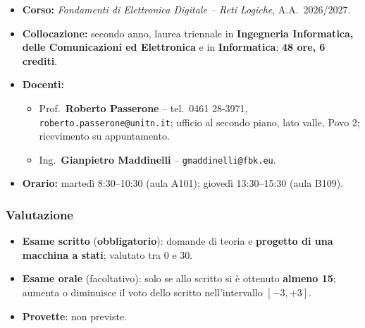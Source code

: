 \documentclass[12pt, a4paper]{article}
\begin{document}
\begin{itemize}
    \item \textbf{Corso:} \emph{Fondamenti di Elettronica Digitale -- Reti Logiche}, A.A.\ 2026/2027.
    \item \textbf{Collocazione:} secondo anno, laurea triennale in \textbf{Ingegneria Informatica, delle Comunicazioni ed Elettronica} e in \textbf{Informatica}; \textbf{48 ore, 6 crediti}.
    \item \textbf{Docenti:}
    \begin{itemize}
        \item Prof.\ \textbf{Roberto Passerone} -- tel.\ 0461 28-3971, \texttt{roberto.passerone@unitn.it}; ufficio al secondo piano, lato valle, Povo 2; ricevimento su appuntamento.
        \item Ing.\ \textbf{Gianpietro Maddinelli} -- \texttt{gmaddinelli@fbk.eu}.
    \end{itemize}
    \item \textbf{Orario:} martedì 8:30--10:30 (aula A101); giovedì 13:30--15:30 (aula B109).
\end{itemize}

\subsubsection{Valutazione}
\begin{itemize}
    \item \textbf{Esame scritto} (\textcolor{red!80!black}{\textbf{obbligatorio}}): domande di teoria e \textbf{progetto di una macchina a stati}; valutato tra 0 e 30.
    \item \textbf{Esame orale} (facoltativo): solo se allo scritto si è ottenuto \textbf{almeno 15}; aumenta o diminuisce il voto dello scritto nell'intervallo $[-3,+3]$.
    \item \textbf{Provette}: non previste.
\end{itemize}
\end{document}
